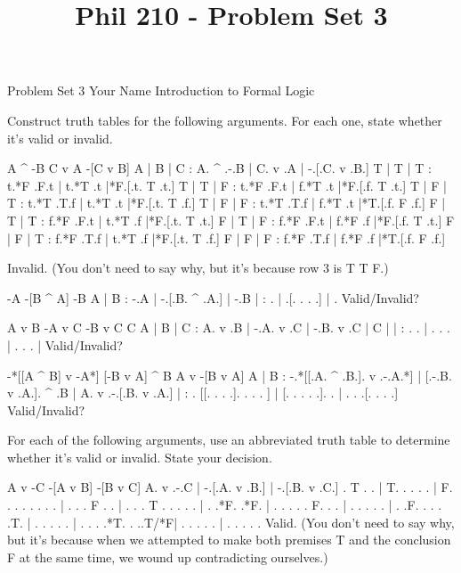 
\title{Phil 210 - Problem Set 3}

\heading
Problem Set 3
Your Name
Introduction to Formal Logic
\endheading

Construct truth tables for the following arguments. For each one, state whether it's valid or invalid.

\problems
{}
\argument
 A ^ -B
 C v A
\argumentline
 -[C v B]
\endargument
        \answer
        \truthtable
         A | B | C : A. ^ .-.B | C. v .A | -.[.C. v .B.]
        \truthtableline
         T | T | T : t.*F .F.t | t.*T .t |*F.[.t. T .t.]
         T | T | F : t.*F .F.t | f.*T .t |*F.[.f. T .t.]
         T | F | T : t.*T .T.f | t.*T .t |*F.[.t. T .f.]
         T | F | F : t.*T .T.f | f.*T .t |*T.[.f. F .f.]
         F | T | T : f.*F .F.t | t.*T .f |*F.[.t. T .t.]
         F | T | F : f.*F .F.t | f.*F .f |*F.[.f. T .t.]
         F | F | T : f.*F .T.f | t.*T .f |*F.[.t. T .f.]
         F | F | F : f.*F .T.f | f.*F .f |*T.[.f. F .f.]
        \endtruthtable

        Invalid. (You don't need to say why, but it's because row 3 is T T F.)
        \endanswer

\argument
 -A
 -[B ^ A]
\argumentline
 -B
\endargument
        \answer
        \truthtable
         A | B : -.A | -.[.B. ^ .A.] | -.B
        \truthtableline
           |   :  .  |  .[. .   . .] |  . 
        \endtruthtable
        Valid/Invalid?
        \endanswer

\argument
 A v B
 -A v C
 -B v C
\argumentline
 C
\endargument
        \answer
        \truthtable
         A | B | C : A. v .B | -.A. v .C | -.B. v .C | C
        \truthtableline
           |   |   :  .   .  |  . .   .  |  . .   .  |  
        \endtruthtable
        Valid/Invalid?
        \endanswer

\argument
 -*[[A ^ B] v -A*]
 [-B v A] ^ B
\argumentline
 A v -[B v A]
\endargument
        \answer
        \truthtable
         A | B : -.*[[.A. ^ .B.]. v .-.A.*] | [.-.B. v .A.]. ^ .B | A. v .-.[.B. v .A.]
        \truthtableline
           |   :  . [[. .   . .].   . . . ] | [. . .   . .].   .  |  .   . .[. .   . .]
        \endtruthtable
        Valid/Invalid?
        \endanswer
\endproblems

For each of the following arguments, use an abbreviated truth table to determine whether it's valid or invalid. State your decision.

\problems
{}
\argument
 A v -C
 -[A v B]
\argumentline
 -[B v C]
\endargument
        \answer
        \truthtable
         A. v .-.C | -.[.A. v .B.] | -.[.B. v .C.]
        \truthtableline
          . T . .  | T. . .   . .  | F. . .   . .
          .   . .  |  . . . F . .  |  . . . T . .
          .   . .  |  . .*F.  .*F. |  . . .   . .
         F.   . .  |  . . .   . .  |  . .F.   . .
          .   .T.  |  . . .   . .  |  . . .   .*T.
          .  ..T/*F|  . . .   . .  |  . . .   . .
        \endtruthtable
        Valid. (You don't need to say why, but it's because when we attempted to make both premises T and the conclusion F at the same time, we wound up contradicting ourselves.)
        \endanswer

